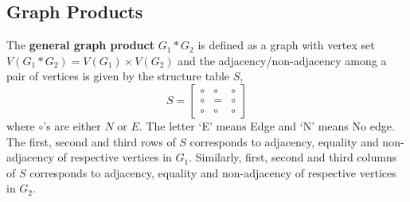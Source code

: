 \subsection{Graph Products}
\begin{definition}
	The \textbf{general graph product} $G_1 \ast G_2$ is defined as a graph with vertex set $V(G_1 \ast G_2) = V(G_1) \times V(G_2)$ and the adjacency/non-adjacency among a pair of vertices is given by the structure table $S$, 
$$ S = \begin{bmatrix} \circ & \circ & \circ \\ \circ & = & \circ \\ \circ & \circ & \circ \end{bmatrix} $$
	where $\circ$'s are either $N$ or $E$. The letter `E' means Edge and `N' means No edge.\\

	The first, second and third rows of $S$ corresponds to adjacency, equality and non-adjacency of respective vertices in $G_1$. Similarly, first, second and third columns of $S$ corresponds to adjacency, equality and non-adjacency of respective vertices in $G_2$.
\end{definition}

